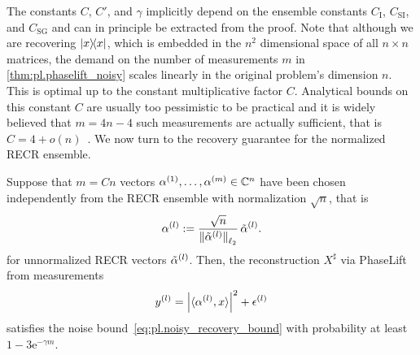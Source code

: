 The constants $C$, $C'$, and $\gamma$ implicitly depend on the ensemble constants $C_\mathrm{I}$, $C_\mathrm{SI}$, and $C_\mathrm{SG}$ and can in principle be extracted from the proof.
Note that although we are recovering $\ketbra{x}$, which is embedded in the $n^2$ dimensional space of all $n \times n$ matrices, the demand on the number of measurements $m$ in \cref{thm:pl.phaselift_noisy} scales linearly in the original problem's dimension $n$.
This is optimal up to the constant multiplicative factor $C$.
Analytical bounds on this constant $C$ are usually too pessimistic to be practical and it is widely believed that
\(
  m = 4n - 4
\)
such measurements are actually sufficient, that is $C = 4 + o(n)$~\cite{Heinosaari_2013_Quantum}.
We now turn to the recovery guarantee for the normalized RECR ensemble.

\begin{theorem}%
  \label{thm:pl.phaselift_noisy_recr}
  Suppose that $m = Cn$ vectors $\alpha^{(1)},\ldots,\alpha^{(m)} \in \mathbb{C}^n$ have been chosen independently from the RECR ensemble with normalization $\sqrt n$, that is
  \[
    \alpha^{(l)} := \frac{\sqrt n}{{\Vert\tilde\alpha^{(l)}\Vert}_{\ell_2}} \, \tilde\alpha^{(l)}.
  \]
  for unnormalized RECR vectors $\tilde\alpha^{(l)}$.
  Then, the reconstruction $X^\sharp$ via PhaseLift from measurements
  \[
    \label{eq:pl.phaselift_noisy_recr.measurements}
    y^{(l)} = {\left\vert\braket{\alpha^{(l)}, x}\right\vert}^2 + \epsilon^{(l)}
  \]
  satisfies the noise bound~\eqref{eq:pl.noisy_recovery_bound} with probability at least $1 - 3\mathrm{e}^{-\gamma m}$.
\end{theorem}
